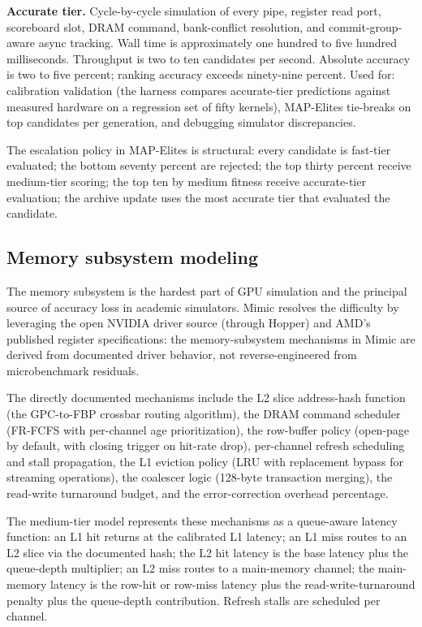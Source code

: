 \textbf{Accurate tier.}
Cycle-by-cycle simulation of every pipe, register read port, scoreboard slot, DRAM command, bank-conflict resolution, and commit-group-aware async tracking.
Wall time is approximately one hundred to five hundred milliseconds.
Throughput is two to ten candidates per second.
Absolute accuracy is two to five percent; ranking accuracy exceeds ninety-nine percent.
Used for: calibration validation (the harness compares accurate-tier predictions against measured hardware on a regression set of fifty kernels), MAP-Elites tie-breaks on top candidates per generation, and debugging simulator discrepancies.

The escalation policy in MAP-Elites is structural: every candidate is fast-tier evaluated; the bottom seventy percent are rejected; the top thirty percent receive medium-tier scoring; the top ten by medium fitness receive accurate-tier evaluation; the archive update uses the most accurate tier that evaluated the candidate.

\subsection{Memory subsystem modeling}
\label{sec:mimic-memory-model}

The memory subsystem is the hardest part of GPU simulation and the principal source of accuracy loss in academic simulators.
Mimic resolves the difficulty by leveraging the open NVIDIA driver source (through Hopper) and AMD's published register specifications: the memory-subsystem mechanisms in Mimic are derived from documented driver behavior, not reverse-engineered from microbenchmark residuals.

The directly documented mechanisms include the L2 slice address-hash function (the GPC-to-FBP crossbar routing algorithm), the DRAM command scheduler (FR-FCFS with per-channel age prioritization), the row-buffer policy (open-page by default, with closing trigger on hit-rate drop), per-channel refresh scheduling and stall propagation, the L1 eviction policy (LRU with replacement bypass for streaming operations), the coalescer logic (128-byte transaction merging), the read-write turnaround budget, and the error-correction overhead percentage.

The medium-tier model represents these mechanisms as a queue-aware latency function: an L1 hit returns at the calibrated L1 latency; an L1 miss routes to an L2 slice via the documented hash; the L2 hit latency is the base latency plus the queue-depth multiplier; an L2 miss routes to a main-memory channel; the main-memory latency is the row-hit or row-miss latency plus the read-write-turnaround penalty plus the queue-depth contribution.
Refresh stalls are scheduled per channel.


